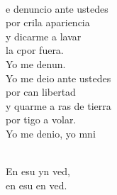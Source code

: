 \documentclass[12pt]{article}
\begin{document}
\begin{multicols*}{2}
\begin{cancion}
\begin{chorus}
	\end{chorus}%
	\jump\\
	e denuncio ante ustedes \\
	por crila apariencia \\
	y dicarme a lavar \\
	la cpor fuera. \\
	Yo me denun. \\
	Yo me deio ante ustedes \\
	por can libertad \\
	y quarme a ras de tierra \\
	por tigo a volar. \\
	Yo me denio, yo mni\\\jump\\
	\begin{chorus}%
	En esu yn ved, \\
	en esu en ved.\\
	\end{chorus}%
	\jump\\
\end{cancion}%


\end{multicols*}
\end{document}
